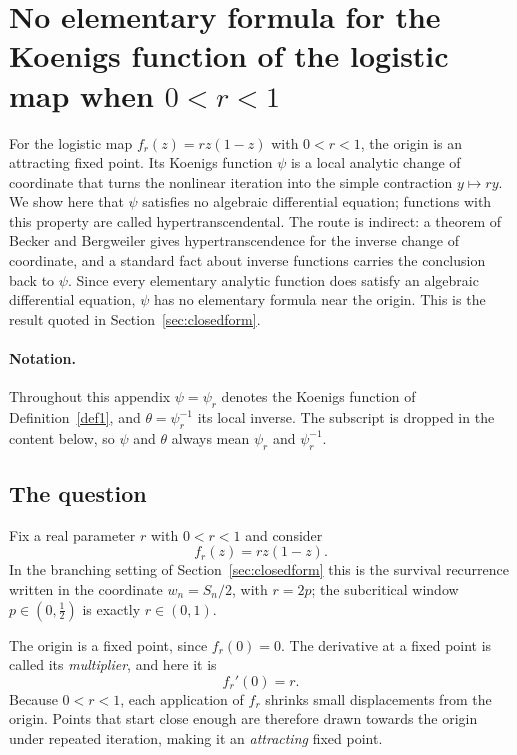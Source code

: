 \documentclass[11pt]{article}
\begin{document}
\appendix


\section{No elementary formula for the Koenigs function of the logistic map when \texorpdfstring{$0<r<1$}{0 < r < 1}}
\label{app:hyper}

For the logistic map $f_r(z)=rz(1-z)$ with $0<r<1$, the origin is an attracting fixed point. Its Koenigs function $\psi$ is a local analytic change of coordinate that turns the nonlinear iteration into the simple contraction $y\mapsto ry$. We show here that $\psi$ satisfies no algebraic differential equation; functions with this property are called hypertranscendental. The route is indirect: a theorem of Becker and Bergweiler gives hypertranscendence for the inverse change of coordinate, and a standard fact about inverse functions carries the conclusion back to $\psi$. Since every elementary analytic function does satisfy an algebraic differential equation, $\psi$ has no elementary formula near the origin. This is the result quoted in Section~\ref{sec:closedform}.

\paragraph{Notation.} Throughout this appendix $\psi=\psi_r$ denotes the Koenigs function of Definition~\ref{def1}, and $\theta=\psi_r^{-1}$ its local inverse. The subscript is dropped in the content below, so $\psi$ and $\theta$ always mean $\psi_r$ and $\psi_r^{-1}$.

\subsection{The question}

Fix a real parameter $r$ with $0<r<1$ and consider
\begin{equation}
 f_r(z)=rz(1-z).
\end{equation}
In the branching setting of Section~\ref{sec:closedform} this is the survival recurrence written in the coordinate $w_n=S_n/2$, with $r=2p$; the subcritical window $p\in(0,\tfrac12)$ is exactly $r\in(0,1)$.

The origin is a fixed point, since $f_r(0)=0$. The derivative at a fixed point is called its \emph{multiplier}, and here it is
\[
 f_r'(0)=r.
\]
Because $0<r<1$, each application of $f_r$ shrinks small displacements from the origin. Points that start close enough are therefore drawn towards the origin under repeated iteration, making it an \emph{attracting} fixed point.
\end{document}
